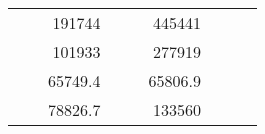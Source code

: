 \begin{table}[]
\begin{tabular}{|ccrccrccc}
\multicolumn{1}{|c|}{\cellcolor[HTML]{FFFFC7}}                                & \multicolumn{1}{c|}{\cellcolor[HTML]{DDFDFF}}                      & \multicolumn{1}{r|}{\cellcolor[HTML]{DAE8FC}191744}    & \multicolumn{1}{c|}{\cellcolor[HTML]{FFFFC7}}                                & \multicolumn{1}{c|}{\cellcolor[HTML]{DDFDFF}}                       & \multicolumn{1}{r|}{\cellcolor[HTML]{DDFDFF}445441}    &                                                                              &                                                                    &                                                        \\ \cline{3-3} \cline{6-6}
\multicolumn{1}{|c|}{\cellcolor[HTML]{FFFFC7}}                                & \multicolumn{1}{c|}{\cellcolor[HTML]{DDFDFF}}                      & \multicolumn{1}{r|}{\cellcolor[HTML]{DDFDFF}101933}    & \multicolumn{1}{c|}{\cellcolor[HTML]{FFFFC7}}                                & \multicolumn{1}{c|}{\cellcolor[HTML]{DDFDFF}}                       & \multicolumn{1}{r|}{\cellcolor[HTML]{DAE8FC}277919}    &                                                                              &                                                                    &                                                        \\ \cline{3-3} \cline{6-6}
\multicolumn{1}{|c|}{\cellcolor[HTML]{FFFFC7}}                                & \multicolumn{1}{c|}{\cellcolor[HTML]{DDFDFF}}                      & \multicolumn{1}{r|}{\cellcolor[HTML]{DAE8FC}65749.4}   & \multicolumn{1}{c|}{\cellcolor[HTML]{FFFFC7}}                                & \multicolumn{1}{c|}{\cellcolor[HTML]{DDFDFF}}                       & \multicolumn{1}{r|}{\cellcolor[HTML]{DDFDFF}65806.9}   &                                                                              &                                                                    &                                                        \\ \cline{3-3} \cline{6-6}
\multicolumn{1}{|c|}{\cellcolor[HTML]{FFFFC7}}                                & \multicolumn{1}{c|}{\cellcolor[HTML]{DDFDFF}}                      & \multicolumn{1}{r|}{\cellcolor[HTML]{DDFDFF}78826.7}   & \multicolumn{1}{c|}{\cellcolor[HTML]{FFFFC7}}                                & \multicolumn{1}{c|}{\cellcolor[HTML]{DDFDFF}}                       & \multicolumn{1}{r|}{\cellcolor[HTML]{DAE8FC}133560}    &                                                                              &                                                                    &                                                        \\ \cline{3-3} \cline{6-6}

\end{tabular}
\end{table}
